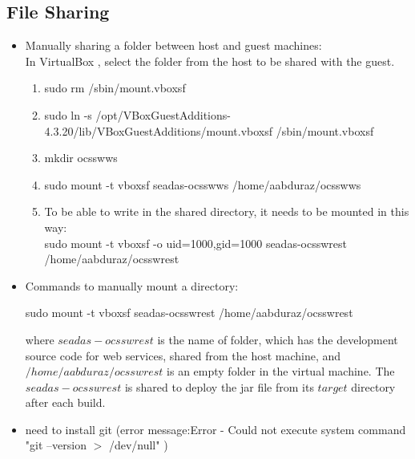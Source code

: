 \documentclass[11pt, oneside]{article}   	%
\begin{document}
\subsection{File Sharing}
\begin{itemize}

\item Manually sharing a folder between host and guest machines: \\
In VirtualBox {\color{blue}{\bf Devices  $\rightarrow $  Shared Folder Settings...  $\rightarrow $ Shared Folders  $\rightarrow $  Machine Folders}}, select the folder from the host to be shared with the guest.
   \begin{enumerate}
      \item sudo rm /sbin/mount.vboxsf
      \item sudo ln -s /opt/VBoxGuestAdditions-4.3.20/lib/VBoxGuestAdditions/mount.vboxsf /sbin/mount.vboxsf
      \item mkdir ocsswws
      \item sudo mount -t vboxsf seadas-ocsswws /home/aabduraz/ocsswws
      \item To be able to write in the shared directory, it needs to be mounted in this way:\\
      sudo mount -t vboxsf -o uid=1000,gid=1000 seadas-ocsswrest /home/aabduraz/ocsswrest

   \end{enumerate}

\item Commands to manually mount a directory:
\begin{code}
sudo mount -t vboxsf seadas-ocsswrest /home/aabduraz/ocsswrest
\end{code}
where $seadas-ocsswrest$ is the name of folder, which has the development source code for web services, shared from the host machine, and $/home/aabduraz/ocsswrest$ is an empty folder in the virtual machine. The  $seadas-ocsswrest$ is shared to deploy the jar file from its $target$ directory after each build. 

\item need to install git
(error message:Error - Could not execute system command "git --version $>$ /dev/null" )

\end{itemize}
\end{document}
